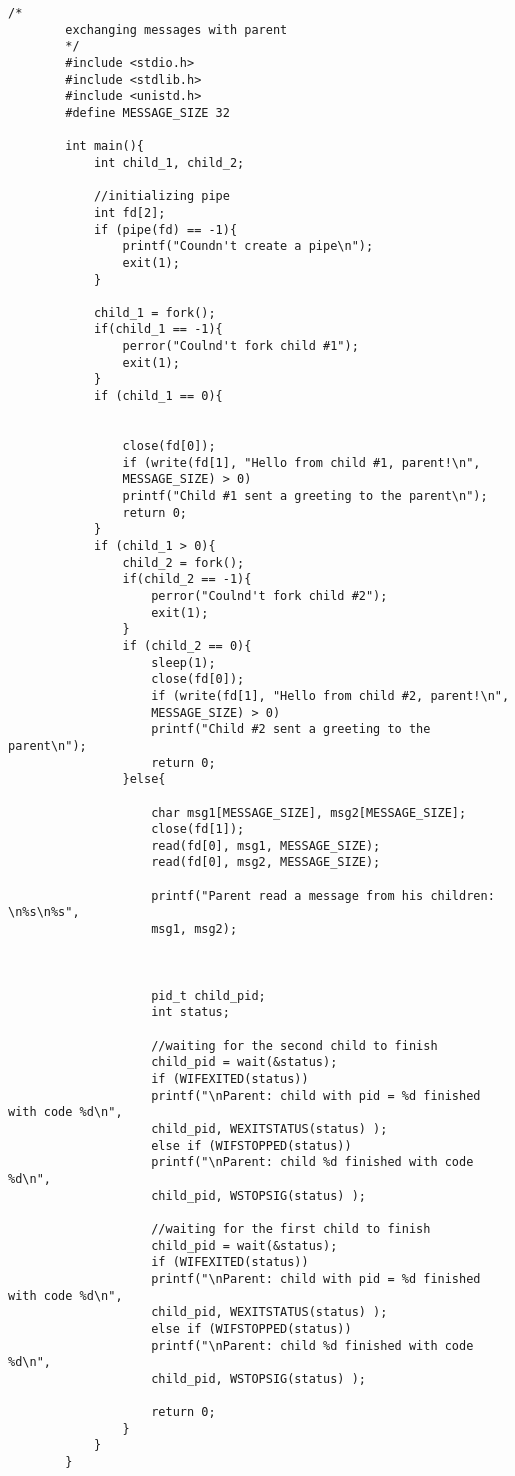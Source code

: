 \documentclass[12pt]{report}
\begin{document}
	\begin{lstlisting}[label=four,caption = Передача сообщений с помощью программного канала, style = CStyle]
		/*
		exchanging messages with parent
		*/
		#include <stdio.h>
		#include <stdlib.h>
		#include <unistd.h>
		#define MESSAGE_SIZE 32
		
		int main(){
			int child_1, child_2;
			
			//initializing pipe
			int fd[2];
			if (pipe(fd) == -1){
				printf("Coundn't create a pipe\n");
				exit(1);
			}
			
			child_1 = fork();
			if(child_1 == -1){
				perror("Coulnd't fork child #1");
				exit(1);
			}
			if (child_1 == 0){
				
				
				close(fd[0]);
				if (write(fd[1], "Hello from child #1, parent!\n",
				MESSAGE_SIZE) > 0)
				printf("Child #1 sent a greeting to the parent\n");
				return 0;
			}
			if (child_1 > 0){
				child_2 = fork();
				if(child_2 == -1){
					perror("Coulnd't fork child #2");
					exit(1);
				}
				if (child_2 == 0){
					sleep(1);
					close(fd[0]);
					if (write(fd[1], "Hello from child #2, parent!\n",
					MESSAGE_SIZE) > 0)
					printf("Child #2 sent a greeting to the parent\n");
					return 0;
				}else{
					
					char msg1[MESSAGE_SIZE], msg2[MESSAGE_SIZE];
					close(fd[1]);
					read(fd[0], msg1, MESSAGE_SIZE);
					read(fd[0], msg2, MESSAGE_SIZE);
					
					printf("Parent read a message from his children: \n%s\n%s",
					msg1, msg2); 
					
					
					
					pid_t child_pid;
					int status;
					
					//waiting for the second child to finish
					child_pid = wait(&status);
					if (WIFEXITED(status))
					printf("\nParent: child with pid = %d finished with code %d\n",
					child_pid, WEXITSTATUS(status) );
					else if (WIFSTOPPED(status))
					printf("\nParent: child %d finished with code %d\n",
					child_pid, WSTOPSIG(status) );
					
					//waiting for the first child to finish	 
					child_pid = wait(&status);
					if (WIFEXITED(status))
					printf("\nParent: child with pid = %d finished with code %d\n",
					child_pid, WEXITSTATUS(status) );
					else if (WIFSTOPPED(status))
					printf("\nParent: child %d finished with code %d\n",
					child_pid, WSTOPSIG(status) );
					
					return 0;
				}
			}
		}
		
		
		
	\end{lstlisting}
\end{document}
